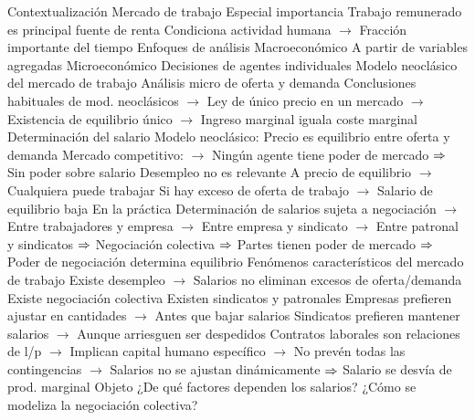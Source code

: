 \documentclass{nuevotema}
\begin{document}
\esquemalargo














\begin{esquemal}
	\1[] 
		\2 Contextualización
			\3 Mercado de trabajo
				\4 Especial importancia
				\4[] Trabajo remunerado es principal fuente de renta
				\4[] Condiciona actividad humana
				\4[] $\to$ Fracción importante del tiempo
			\3 Enfoques de análisis
				\4 Macroeconómico
				\4[] A partir de variables agregadas
				\4 Microeconómico
				\4[] Decisiones de agentes individuales
				\4 Modelo neoclásico del mercado de trabajo
				\4[] Análisis micro de oferta y demanda
				\4[] Conclusiones habituales de mod. neoclásicos
				\4[] $\to$ Ley de único precio en un mercado
				\4[] $\to$ Existencia de equilibrio único
				\4[] $\to$ Ingreso marginal iguala coste marginal
			\3 Determinación del salario
				\4 Modelo neoclásico:
				\4[] Precio es equilibrio entre oferta y demanda
				\4[] Mercado competitivo:
				\4[] $\to$ Ningún agente tiene poder de mercado
				\4[] $\Rightarrow$ Sin poder sobre salario
				\4[] Desempleo no es relevante
				\4[] A precio de equilibrio
				\4[] $\to$ Cualquiera puede trabajar
				\4[] Si hay exceso de oferta de trabajo
				\4[] $\to$ Salario de equilibrio baja
				\4 En la práctica
				\4[] Determinación de salarios sujeta a negociación
				\4[] $\to$ Entre trabajadores y empresa
				\4[] $\to$ Entre empresa y sindicato
				\4[] $\to$ Entre patronal y sindicatos
				\4[] $\Rightarrow$ Negociación colectiva
				\4[] $\Rightarrow$ Partes tienen poder de mercado
				\4[] $\Rightarrow$ Poder de negociación determina equilibrio
				\4 Fenómenos característicos del mercado de trabajo
				\4[] Existe desempleo
				\4[] $\to$ Salarios no eliminan excesos de oferta/demanda
				\4[] Existe negociación colectiva
				\4[] Existen sindicatos y patronales
				\4[] Empresas prefieren ajustar en cantidades
				\4[] $\to$ Antes que bajar salarios
				\4[] Sindicatos prefieren mantener salarios
				\4[] $\to$ Aunque arriesguen ser despedidos
				\4[] Contratos laborales son relaciones de l/p
				\4[] $\to$ Implican capital humano específico
				\4[] $\to$ No prevén todas las contingencias
				\4[] $\to$ Salarios no se ajustan dinámicamente
				\4[] $\Rightarrow$ Salario se desvía de prod. marginal
		\2 Objeto
			\3 ¿De qué factores dependen los salarios?
			\3 ¿Cómo se modeliza la negociación colectiva?

\end{esquemal}
\end{document}

